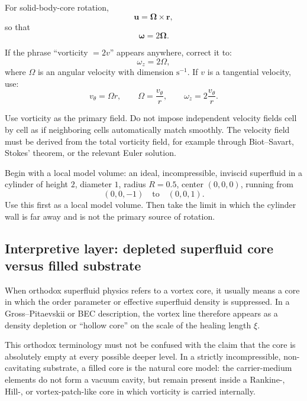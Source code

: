 \documentclass[11pt]{article}
\begin{document}
            For solid-body-core rotation,
            \[
                \mathbf{u}
                =
                \boldsymbol{\Omega}\times\mathbf{r},
            \]
            so that
            \[
                \boldsymbol{\omega}
                =
                2\boldsymbol{\Omega}.
            \]
            
            If the phrase ``vorticity \(=2v\)'' appears anywhere, correct it to:
            \[
                \omega_z=2\Omega,
            \]
            where \(\Omega\) is an angular velocity with dimension \(\mathrm{s^{-1}}\).
            If \(v\) is a tangential velocity, use:
            \[
                v_{\theta}=\Omega r,
                \qquad
                \Omega=\frac{v_{\theta}}{r},
                \qquad
                \omega_z=2\frac{v_{\theta}}{r}.
            \]
            
            Use vorticity as the primary field. Do not impose independent velocity fields cell by cell as if neighboring cells automatically match smoothly. The velocity field must be derived from the total vorticity field, for example through Biot--Savart, Stokes' theorem, or the relevant Euler solution.
            
            Begin with a local model volume: an ideal, incompressible, inviscid superfluid in a cylinder of height \(2\), diameter \(1\), radius \(R=0.5\), center \((0,0,0)\), running from
            \[
                (0,0,-1)
                \quad\text{to}\quad
                (0,0,1).
            \]
            Use this first as a local model volume. Then take the limit in which the cylinder wall is far away and is not the primary source of rotation.
        \subsection*{Interpretive layer: depleted superfluid core versus filled substrate}
        
        When orthodox superfluid physics refers to a vortex core, it usually means a core in which the order parameter or effective superfluid density is suppressed. In a Gross--Pitaevskii or BEC description, the vortex line therefore appears as a density depletion or ``hollow core'' on the scale of the healing length \(\xi\).
        
        This orthodox terminology must not be confused with the claim that the core is absolutely empty at every possible deeper level. In a strictly incompressible, non-cavitating substrate, a filled core is the natural core model: the carrier-medium elements do not form a vacuum cavity, but remain present inside a Rankine-, Hill-, or vortex-patch-like core in which vorticity is carried internally.
        
\end{document}
